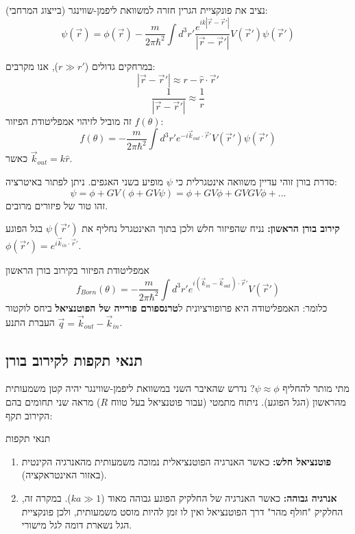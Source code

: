 נציב את פונקציית הגרין חזרה למשוואת ליפמן-שווינגר (בייצוג המרחבי):
$$ \psi(\vec{r}) = \phi(\vec{r}) - \frac{m}{2\pi \hbar^2} \int d^3r' \frac{e^{ik|\vec{r}-\vec{r}'|}}{|\vec{r}-\vec{r}'|} V(\vec{r}') \psi(\vec{r}') $$

במרחקים גדולים ($r \gg r'$), אנו מקרבים:
$$ |\vec{r}-\vec{r}'| \approx r - \hat{r}\cdot\vec{r}' $$
$$ \frac{1}{|\vec{r}-\vec{r}'|} \approx \frac{1}{r} $$
זה מוביל לזיהוי אמפליטודת הפיזור $f(\theta)$:
$$ f(\theta) = -\frac{m}{2\pi \hbar^2} \int d^3r' e^{-i \vec{k}_{out} \cdot \vec{r}'} V(\vec{r}') \psi(\vec{r}') $$
כאשר $\vec{k}_{out} = k\hat{r}$.

\begin{summarybox}{סדרת בורן}
זוהי עדיין משוואה אינטגרלית כי $\psi$ מופיע בשני האגפים. ניתן לפתור באיטרציה:
$$ \psi = \phi + G V (\phi + G V \psi) = \phi + G V \phi + G V G V \phi + \dots $$
זהו טור של פיזורים מרובים.
\end{summarybox}

\textbf{קירוב בורן הראשון:} נניח שהפיזור חלש ולכן בתוך האינטגרל נחליף את $\psi(\vec{r}')$ בגל הפוגע $\phi(\vec{r}') = e^{i\vec{k}_{in}\cdot\vec{r}'}$.

\begin{formulabox}{אמפליטודת הפיזור בקירוב בורן הראשון}
$$ f_{Born}(\theta) = -\frac{m}{2\pi \hbar^2} \int d^3r' e^{i(\vec{k}_{in} - \vec{k}_{out})\cdot\vec{r}'} V(\vec{r}') $$
כלומר: האמפליטודה היא פרופורציונית ל\textbf{טרנספורם פורייה של הפוטנציאל} ביחס לוקטור העברת התנע $\vec{q} = \vec{k}_{out} - \vec{k}_{in}$.
\end{formulabox}

\subsection{תנאי תקפות לקירוב בורן}
מתי מותר להחליף $\psi \approx \phi$?
נדרש שהאיבר השני במשוואת ליפמן-שווינגר יהיה קטן משמעותית מהראשון (הגל הפוגע).
ניתוח מתמטי (עבור פוטנציאל בעל טווח $R$) מראה שני תחומים בהם הקירוב תקף:

\begin{warningbox}{תנאי תקפות}
\begin{enumerate}
    \item \textbf{פוטנציאל חלש:} כאשר האנרגיה הפוטנציאלית נמוכה משמעותית מהאנרגיה הקינטית (באזור האינטראקציה).
    \item \textbf{אנרגיה גבוהה:} כאשר האנרגיה של החלקיק הפוגע גבוהה מאוד ($ka \gg 1$). במקרה זה, החלקיק "חולף מהר" דרך הפוטנציאל ואין לו זמן להיות מוסט משמעותית, ולכן פונקציית הגל נשארת דומה לגל מישורי.
\end{enumerate}
\end{warningbox}